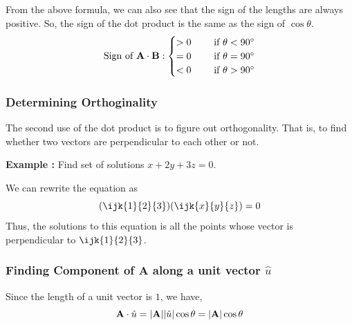From the above formula, we can also see that the sign of the lengths are always positive.
So, the sign of the dot product is the same as the sign of $\cos \theta$.
$$
\text{Sign of } {\bf A} \cdot {\bf B} :
	\begin{cases}
		> 0 & \quad \text{ if } \theta < 90^{\circ} \\
		= 0 & \quad \text{ if } \theta = 90^{\circ} \\
		< 0 & \quad \text{ if } \theta > 90^{\circ}
	\end{cases}
$$

\subsubsection{Determining Orthoginality}

The second use of the dot product is to figure out orthogonality.
That is, to find whether two vectors are perpendicular to each other or not.

{\bf Example : } Find set of solutions $x + 2y + 3z = 0$.


We can rewrite the equation as $$ (\ijk{1}{2}{3})(\ijk{x}{y}{z}) = 0 $$
Thus, the solutions to this equation is all the points whose vector is perpendicular to $\ijk{1}{2}{3}$.


\subsubsection{Finding Component of {\bf A} along a unit vector $\hat{u}$}

Since the length of a unit vector is $1$, we have,
$$ {\bf A} \cdot \hat{u} = |{\bf A}||\hat{u}| \cos \theta = |{\bf A}|\cos \theta $$